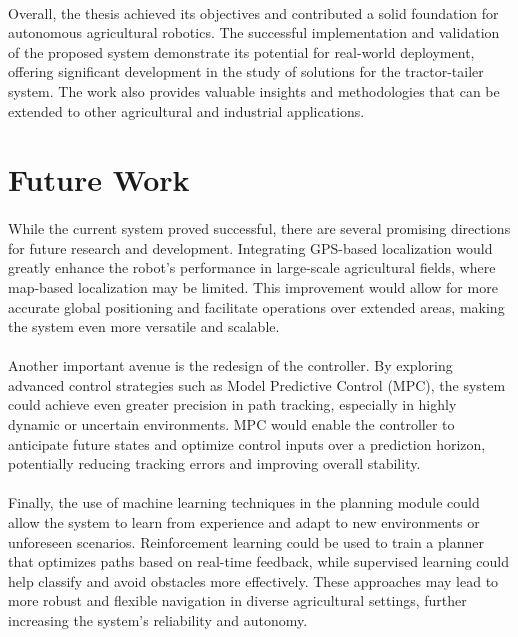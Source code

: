\paragraph{}Overall, the thesis achieved its objectives and contributed a solid foundation for autonomous agricultural 
robotics. The successful implementation and validation of the proposed system demonstrate its potential for real-world 
deployment, offering significant development in the study of solutions for the tractor-tailer system. 
The work also provides valuable insights and methodologies that can be extended to other agricultural and 
industrial applications.


\section{Future Work}
\label{sec:future_work}
\paragraph{}While the current system proved successful, there are several promising directions for future research and development. Integrating GPS-based localization would greatly enhance the robot's performance in large-scale agricultural fields, where map-based localization may be limited. This improvement would allow for more accurate global positioning and facilitate operations over extended areas, making the system even more versatile and scalable.

\paragraph{}Another important avenue is the redesign of the controller. By exploring advanced control strategies such as Model Predictive Control (MPC), the system could achieve even greater precision in path tracking, especially in highly dynamic or uncertain environments. MPC would enable the controller to anticipate future states and optimize control inputs over a prediction horizon, potentially reducing tracking errors and improving overall stability.

\paragraph{}Finally, the use of machine learning techniques in the planning module could allow the system to learn from experience and adapt to new environments or unforeseen scenarios. Reinforcement learning could be used to train a planner that optimizes paths based on real-time feedback, while supervised learning could help classify and avoid obstacles more effectively. These approaches may lead to more robust and flexible navigation in diverse agricultural settings, further increasing the system's reliability and autonomy.


